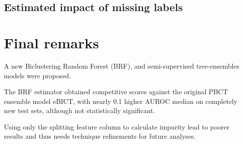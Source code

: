 \subsection{Estimated impact of missing labels}


\section{Final remarks}

A new Biclustering Random Forest (BRF), and semi-supervised tree-ensembles models were proposed.

The BRF estimator obtained competitive scores against the original PBCT ensemble model eBICT, with nearly 0.1 higher AUROC median on completely new test sets, although not statistically significant.

Using only the splitting feature column to calculate impurity lead to poorer results and thus needs technique refinements for future analyses.

% 
% 
% 
% 
